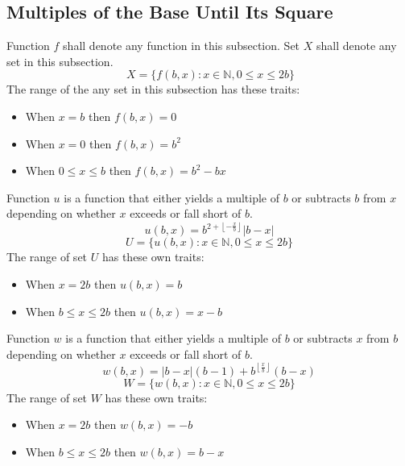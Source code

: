 \documentclass[letterpaper, twoside,12pt]{article}
\begin{document}
    \subsection{Multiples of the Base Until Its Square} \label{u_and_w}
    Function $f$ shall denote any function in this subsection. Set $X$ shall denote any set in this subsection.
    \begin{equation}\
            X = \{ f(b,x) : x \in \mathbb{N}, 0 \leq x \leq 2b \}
    \end{equation}
    The range of the any set in this subsection has these traits:
    \begin{itemize}
        \item When $x = b$ then $f(b,x) = 0$
        \item When $x = 0$ then $f(b,x) = b^2$
        \item When $0 \leq x \leq b$ then $f(b,x) = b^2 - bx$
    \end{itemize}
    Function $u$ is a function that either yields a multiple of $b$ or subtracts $b$ from $x$ depending on whether $x$ exceeds or fall short of $b$.
    \begin{equation}
        u(b,x) = b^{2 + \left\lfloor -\frac{x}{b} \right\rfloor }|b-x|
    \end{equation}
    \begin{equation}
        U = \{ u(b,x) : x \in \mathbb{N}, 0 \leq x \leq 2b \}
    \end{equation}
    The range of set $U$ has these own traits:
    \begin{itemize}
        \item When $x = 2b$ then $u(b,x) = b$
        \item When $b \leq x \leq 2b$ then $u(b,x) = x - b$
    \end{itemize}

    Function $w$ is a function that either yields a multiple of $b$ or subtracts $x$ from $b$ depending on whether $x$ exceeds or fall short of $b$.
    \begin{equation}
        w(b,x) = |b-x|(b-1) + b^{\left\lfloor \frac{x}{b} \right\rfloor}(b-x)
    \end{equation}
    \begin{equation}
        W = \{ w(b,x) : x \in \mathbb{N}, 0 \leq x \leq 2b \}
    \end{equation}
    The range of set $W$ has these own traits:
    \begin{itemize}
        \item When $x = 2b$ then $w(b,x) = -b$
        \item When $b \leq x \leq 2b$ then $w(b,x) = b - x$
    \end{itemize}
\end{document}
